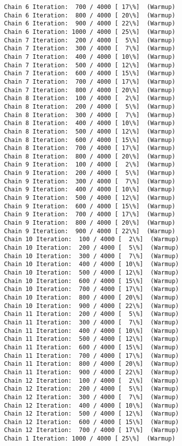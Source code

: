 \documentclass[11pt]{article}
\begin{document}
\begin{Verbatim}[commandchars=\\\{\}]
Chain 6 Iteration:  700 / 4000 [ 17\%]  (Warmup)
Chain 6 Iteration:  800 / 4000 [ 20\%]  (Warmup)
Chain 6 Iteration:  900 / 4000 [ 22\%]  (Warmup)
Chain 6 Iteration: 1000 / 4000 [ 25\%]  (Warmup)
Chain 7 Iteration:  200 / 4000 [  5\%]  (Warmup)
Chain 7 Iteration:  300 / 4000 [  7\%]  (Warmup)
Chain 7 Iteration:  400 / 4000 [ 10\%]  (Warmup)
Chain 7 Iteration:  500 / 4000 [ 12\%]  (Warmup)
Chain 7 Iteration:  600 / 4000 [ 15\%]  (Warmup)
Chain 7 Iteration:  700 / 4000 [ 17\%]  (Warmup)
Chain 7 Iteration:  800 / 4000 [ 20\%]  (Warmup)
Chain 8 Iteration:  100 / 4000 [  2\%]  (Warmup)
Chain 8 Iteration:  200 / 4000 [  5\%]  (Warmup)
Chain 8 Iteration:  300 / 4000 [  7\%]  (Warmup)
Chain 8 Iteration:  400 / 4000 [ 10\%]  (Warmup)
Chain 8 Iteration:  500 / 4000 [ 12\%]  (Warmup)
Chain 8 Iteration:  600 / 4000 [ 15\%]  (Warmup)
Chain 8 Iteration:  700 / 4000 [ 17\%]  (Warmup)
Chain 8 Iteration:  800 / 4000 [ 20\%]  (Warmup)
Chain 9 Iteration:  100 / 4000 [  2\%]  (Warmup)
Chain 9 Iteration:  200 / 4000 [  5\%]  (Warmup)
Chain 9 Iteration:  300 / 4000 [  7\%]  (Warmup)
Chain 9 Iteration:  400 / 4000 [ 10\%]  (Warmup)
Chain 9 Iteration:  500 / 4000 [ 12\%]  (Warmup)
Chain 9 Iteration:  600 / 4000 [ 15\%]  (Warmup)
Chain 9 Iteration:  700 / 4000 [ 17\%]  (Warmup)
Chain 9 Iteration:  800 / 4000 [ 20\%]  (Warmup)
Chain 9 Iteration:  900 / 4000 [ 22\%]  (Warmup)
Chain 10 Iteration:  100 / 4000 [  2\%]  (Warmup)
Chain 10 Iteration:  200 / 4000 [  5\%]  (Warmup)
Chain 10 Iteration:  300 / 4000 [  7\%]  (Warmup)
Chain 10 Iteration:  400 / 4000 [ 10\%]  (Warmup)
Chain 10 Iteration:  500 / 4000 [ 12\%]  (Warmup)
Chain 10 Iteration:  600 / 4000 [ 15\%]  (Warmup)
Chain 10 Iteration:  700 / 4000 [ 17\%]  (Warmup)
Chain 10 Iteration:  800 / 4000 [ 20\%]  (Warmup)
Chain 10 Iteration:  900 / 4000 [ 22\%]  (Warmup)
Chain 11 Iteration:  200 / 4000 [  5\%]  (Warmup)
Chain 11 Iteration:  300 / 4000 [  7\%]  (Warmup)
Chain 11 Iteration:  400 / 4000 [ 10\%]  (Warmup)
Chain 11 Iteration:  500 / 4000 [ 12\%]  (Warmup)
Chain 11 Iteration:  600 / 4000 [ 15\%]  (Warmup)
Chain 11 Iteration:  700 / 4000 [ 17\%]  (Warmup)
Chain 11 Iteration:  800 / 4000 [ 20\%]  (Warmup)
Chain 11 Iteration:  900 / 4000 [ 22\%]  (Warmup)
Chain 12 Iteration:  100 / 4000 [  2\%]  (Warmup)
Chain 12 Iteration:  200 / 4000 [  5\%]  (Warmup)
Chain 12 Iteration:  300 / 4000 [  7\%]  (Warmup)
Chain 12 Iteration:  400 / 4000 [ 10\%]  (Warmup)
Chain 12 Iteration:  500 / 4000 [ 12\%]  (Warmup)
Chain 12 Iteration:  600 / 4000 [ 15\%]  (Warmup)
Chain 12 Iteration:  700 / 4000 [ 17\%]  (Warmup)
Chain 1 Iteration: 1000 / 4000 [ 25\%]  (Warmup)

\end{Verbatim}
\end{document}
